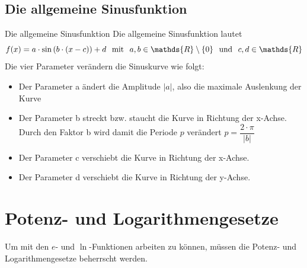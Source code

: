 \subsection{Die allgemeine Sinusfunktion}
\begin{b8d}{Die allgemeine Sinusfunktion}{} \label{SinCosAllgFunkt}
    Die allgemeine Sinusfunktion lautet $$f(x)= a\cdot \sin{(b\cdot (x - c))}+d \hspace{0.25cm} \text{mit} \hspace{0.25cm} a,b\in \mathds{R}\setminus\{0\} \hspace{0.25cm} \text{und} \hspace{0.25cm} c,d \in \mathds{R}$$
    Die vier Parameter verändern die Sinuskurve wie folgt:
    \begin{itemize}
        \item Der Parameter a ändert die Amplitude $|a|$, also die maximale Auslenkung der Kurve
        \item Der Parameter b streckt bzw. staucht die Kurve in Richtung der x-Achse. Durch den Faktor b wird damit die Periode $p$ verändert $p = \dfrac{2\cdot \pi}{|b|}$
        \item Der Parameter c verschiebt die Kurve in Richtung der x-Achse.
        \item Der Parameter d verschiebt die Kurve in Richtung der y-Achse.
    \end{itemize}
\end{b8d}
\begin{center}
\end{center}
\section{Potenz- und Logarithmengesetze}
Um mit den $e$- und  $\ln$-Funktionen arbeiten zu können, müssen die Potenz- und Logarithmengesetze beherrscht werden.
